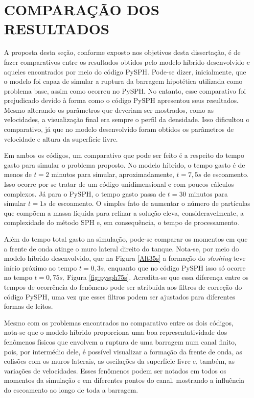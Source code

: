\section{COMPARAÇÃO DOS RESULTADOS} \label{Comparacao}

A proposta desta seção, conforme exposto nos objetivos desta dissertação, é de fazer comparativos entre os resultados obtidos pelo modelo híbrido desenvolvido e aqueles encontrados por meio do código PySPH. Pode-se dizer, inicialmente, que o modelo foi capaz de simular a ruptura da barragem hipotética utilizada como problema base, assim como ocorreu no PySPH. No entanto, esse comparativo foi prejudicado devido à forma como o código PySPH apresentou seus resultados. Mesmo alterando os parâmetros que deveriam ser mostrados, como as velocidades, a visualização final era sempre o perfil da densidade. Isso dificultou o comparativo, já que no modelo desenvolvido foram obtidos os parâmetros de velocidade e altura da superfície livre.

Em ambos os códigos, um comparativo que pode ser feito é a respeito do tempo gasto para simular o problema proposto. No modelo híbrido, o tempo gasto é de menos de $t=2$ minutos para simular, aproximadamente, $t=7,5s$ de escoamento. Isso ocorre por se tratar de um código unidimensional e com poucos cálculos complexos. Já para o PySPH, o tempo gasto passa de $t=30$ minutos para simular $t=1s$ de escoamento. O simples fato de aumentar o número de partículas que compõem a massa líquida para refinar a solução eleva, consideravelmente,  a complexidade do método SPH e, em consequência, o tempo de processamento.

Além do tempo total gasto na simulação, pode-se comparar os momentos em que a frente de onda atinge o muro lateral direito do tanque. Nota-se, por meio do modelo híbrido desenvolvido, que na Figura \ref{Alt35s} a formação do \textit{sloshing} teve início próximo ao tempo $t=0,3s$, enquanto que no código PySPH isso só ocorre no tempo $t=0,75s$, Figura \ref{fig:pysph75s}. Acredita-se que essa diferença entre os tempos de ocorrência do fenômeno pode ser atribuída aos filtros de correção do código PySPH, uma vez que esses filtros podem ser ajustados para diferentes formas de leitos.

Mesmo com os problemas encontrados no comparativo entre os dois códigos, nota-se que o modelo híbrido proporciona uma boa representatividade dos fenômenos físicos que envolvem a ruptura de uma barragem num canal finito, pois, por intermédio dele, é possível visualizar a formação da frente de onda, as colisões com os muros laterais, as oscilações da superfície livre e, também, as variações de velocidades. Esses fenômenos podem ser notados em todos os momentos da simulação e em diferentes pontos do canal, mostrando a influência do escoamento ao longo de toda a barragem.         






         









